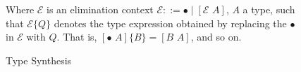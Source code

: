 \documentclass[../main.tex]{subfiles}
\begin{document}
\begin{figure*}[t]
    \begin{prooftree}
    \end{prooftree}
    
    \begin{prooftree}
    \end{prooftree}

Where $\mathcal{E}$ is an elimination context $\mathcal{E} ::= \bullet \mid [\mathcal{E} \,\, A]$, $A$ a type, such that $\mathcal{E}\{Q\}$ denotes the type expression obtained by replacing the $\bullet$ in $\mathcal{E}$ with $Q$. That is, $[\bullet\,\, A]\{B\} = [B\,\,A]$, and so on. 
    \caption{Type Synthesis}
    \label{fig:Plutus_core_type_synthesis}
\end{figure*}
\end{document}
